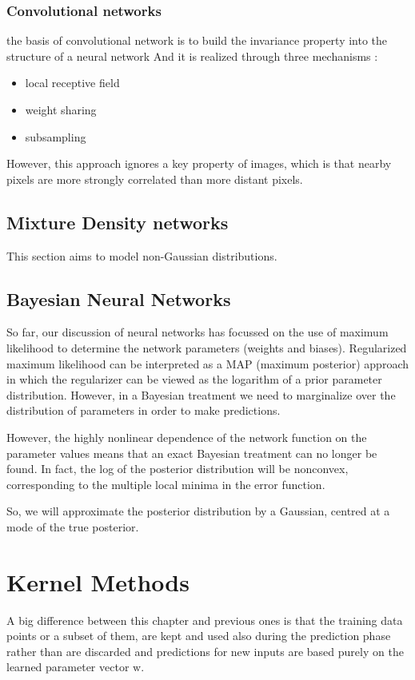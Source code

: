 \documentclass[a4paper]{book}
\begin{document}
\subsubsection{Convolutional networks}
the basis of  convolutional network is to build the invariance property into the structure of a neural network And it is realized through three mechanisms :
\begin{itemize}
  \item local receptive field
  \item weight sharing
  \item subsampling
\end{itemize}
However, this approach ignores a key property of images, which is that nearby pixels are more strongly correlated than more distant pixels.
\subsection{Mixture Density networks}
This section aims to model non-Gaussian distributions.
\subsection{Bayesian Neural Networks}
So far, our discussion of neural networks has focussed on the use of maximum likelihood to determine the network parameters (weights and biases). Regularized maximum likelihood can be interpreted as a MAP (maximum posterior) approach in which the regularizer can be viewed as the logarithm of a prior parameter distribution. However, in a Bayesian treatment we need to marginalize over the distribution of parameters in order to make predictions.

However, the highly nonlinear dependence of the network function on the parameter values means
that an exact Bayesian treatment can no longer be found. In fact, the log of the posterior distribution will be nonconvex, corresponding to the multiple local minima in the error function.

So, we will approximate the posterior distribution by a Gaussian, centred at a mode of the true posterior.

\section{Kernel Methods}
A big difference between this chapter and previous ones is that the training data points or a subset of them, are kept and used also during the prediction phase rather than are discarded and predictions for new inputs are based purely on the learned parameter vector $\mathrm w$.
\end{document}
